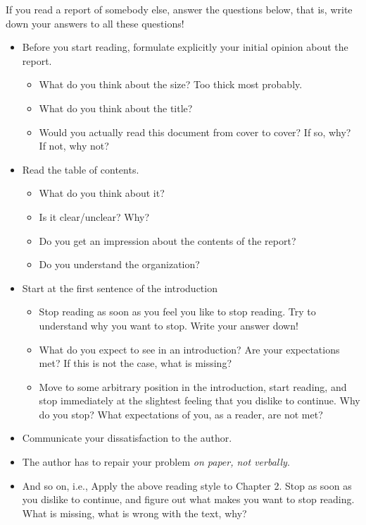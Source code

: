 \documentclass{article}
\begin{document}
If you read a report of somebody else, answer the questions below,
that is,  write down your answers to all these questions!
\begin{itemize}
\item Before you start reading, formulate explicitly your initial
  opinion about the report.
  \begin{itemize}
  \item What do you think about the size? Too thick most probably.
  \item What do you think about the title?
  \item Would you actually read this document from cover to cover? If
    so, why? If not, why not?
  \end{itemize}
\item Read the table of contents. 
  \begin{itemize}
  \item What do you think about it?
  \item Is it clear/unclear? Why?
  \item Do you get an impression about the contents of the report?
  \item Do you understand the organization?
  \end{itemize}
\item Start at the first sentence of the introduction
  \begin{itemize}
  \item Stop reading as soon as you feel you like to stop reading. Try
    to understand why you want to stop. Write your answer down!
  \item What do you expect to see in an introduction? Are your
    expectations met? If this is not the case, what is missing? 
  \item Move to some arbitrary position in the introduction,  start
    reading, and stop immediately at the slightest feeling that you
    dislike to continue. Why do you stop? What expectations of you, as
    a reader, are not met?
  \end{itemize}
\item Communicate your dissatisfaction to the author.
\item The author has to repair your problem \emph{on paper, not verbally}.
\item And so on, i.e., Apply the above reading style to Chapter
  2. Stop as soon as you dislike to continue, and figure out what
  makes you want to stop reading. What is missing, what is wrong with
  the text, why?
\end{itemize}
\end{document}
